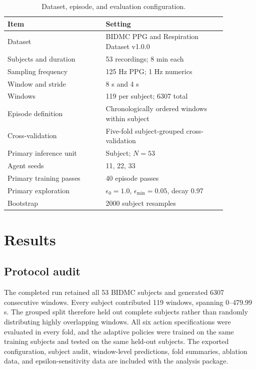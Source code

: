 \documentclass{elektr}
\begin{document}
\begin{table}[h!]
\caption{Dataset, episode, and evaluation configuration.}
\label{tab:protocol}
\begin{center}
\small
\begin{tabular}{p{0.39\linewidth}p{0.48\linewidth}}
\toprule
Item & Setting \\
\midrule
Dataset & BIDMC PPG and Respiration Dataset v1.0.0 \\
Subjects and duration & 53 recordings; 8 min each \\
Sampling frequency & 125 Hz PPG; 1 Hz numerics \\
Window and stride & 8 s and 4 s \\
Windows & 119 per subject; 6307 total \\
Episode definition & Chronologically ordered windows within subject \\
Cross-validation & Five-fold subject-grouped cross-validation \\
Primary inference unit & Subject; $N=53$ \\
Agent seeds & 11, 22, 33 \\
Primary training passes & 40 episode passes \\
Primary exploration & $\epsilon_0=1.0$, $\epsilon_{\min}=0.05$, decay 0.97 \\
Bootstrap & 2000 subject resamples \\
\bottomrule
\end{tabular}
\end{center}
\vs{-4mm}
\end{table}

\section{Results}

\subsection{Protocol audit}

The completed run retained all 53 BIDMC subjects and generated 6307 consecutive windows. Every subject contributed 119 windows, spanning 0--479.99 s. The grouped split therefore held out complete subjects rather than randomly distributing highly overlapping windows. All six action specifications were evaluated in every fold, and the adaptive policies were trained on the same training subjects and tested on the same held-out subjects. The exported configuration, subject audit, window-level predictions, fold summaries, ablation data, and epsilon-sensitivity data are included with the analysis package.
\end{document}
